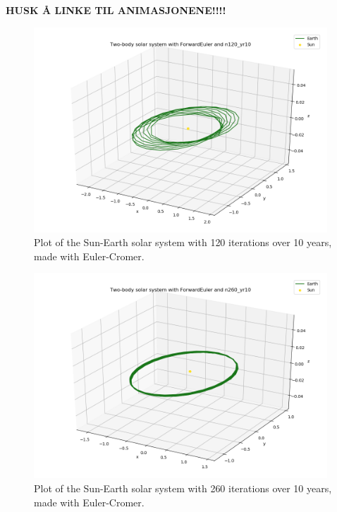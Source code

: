 \documentclass{article}
\begin{document}
    \textbf{HUSK Å LINKE TIL ANIMASJONENE!!!!}

    \begin{figure}[H]
        \centering
        \includegraphics[width = 11cm]{img/plot3D_S_E_F_n120_yr10.png}
        \caption{Plot of the Sun-Earth solar system with 120 iterations over 10 years, made with Euler-Cromer. }
        \label{fig:plot3D_S_E_F_n120_yr10}
    \end{figure}

    \begin{figure}[H]
        \centering
        \includegraphics[width = 11cm]{img/plot3D_S_E_F_n260_yr10.png}
        \caption{Plot of the Sun-Earth solar system with 260 iterations over 10 years, made with Euler-Cromer. }
        \label{fig:plot3D_S_E_F_n260_yr10}
    \end{figure}
\end{document}
